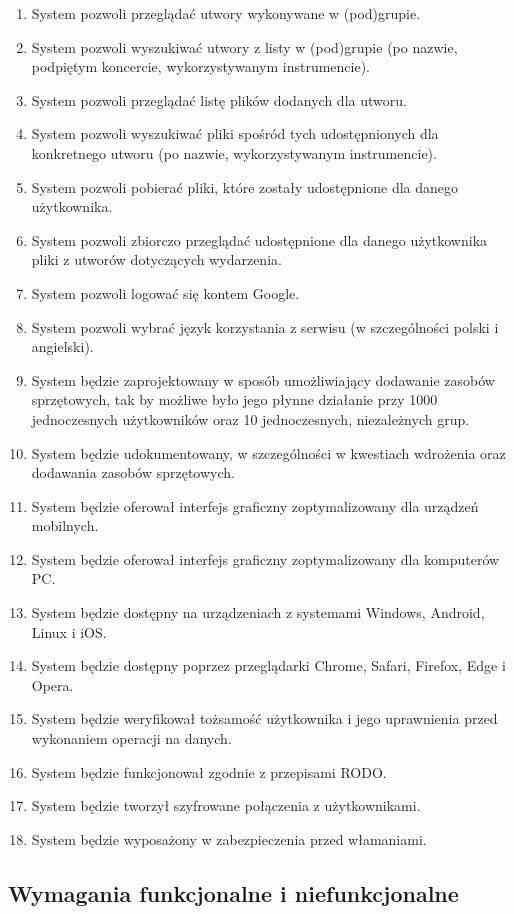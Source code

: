 \documentclass[11pt,a4paper]{article}
\renewcommand{\_}{\char`_}
\begin{document}
\begin{enumerate}
	\item System pozwoli przeglądać utwory wykonywane w (pod)grupie.
	\item System pozwoli wyszukiwać utwory z listy w (pod)grupie (po nazwie, podpiętym koncercie, wykorzystywanym instrumencie).
	\item System pozwoli przeglądać listę plików dodanych dla utworu.
	\item System pozwoli wyszukiwać pliki spośród tych udostępnionych dla konkretnego utworu (po nazwie, wykorzystywanym instrumencie).
	\item System pozwoli pobierać pliki, które zostały udostępnione dla danego użytkownika.
	\item System pozwoli zbiorczo przeglądać udostępnione dla danego użytkownika pliki z utworów dotyczących wydarzenia.
	\item System pozwoli logować się kontem Google.
	\item System pozwoli wybrać język korzystania z serwisu (w szczególności polski i angielski).
	\item System będzie zaprojektowany w sposób umożliwiający dodawanie zasobów sprzętowych, tak by możliwe było jego płynne działanie przy 1000 jednoczesnych użytkowników oraz 10 jednoczesnych, niezależnych grup.
	\item System będzie udokumentowany, w szczególności w kwestiach wdrożenia oraz dodawania zasobów sprzętowych.
	\item System będzie oferował interfejs graficzny zoptymalizowany dla urządzeń mobilnych.
	\item System będzie oferował interfejs graficzny zoptymalizowany dla komputerów PC.
	\item System będzie dostępny na urządzeniach z systemami Windows, Android, Linux i iOS.
	\item System będzie dostępny poprzez przeglądarki Chrome, Safari, Firefox, Edge i Opera.
	\item System będzie weryfikował tożsamość użytkownika i jego uprawnienia przed wykonaniem operacji na danych.
	\item System będzie funkcjonował zgodnie z przepisami RODO.
	\item System będzie tworzył szyfrowane połączenia z użytkownikami.
	\item System będzie wyposażony w zabezpieczenia przed włamaniami.
\end{enumerate}

\subsection{Wymagania funkcjonalne i niefunkcjonalne}
\end{document}
